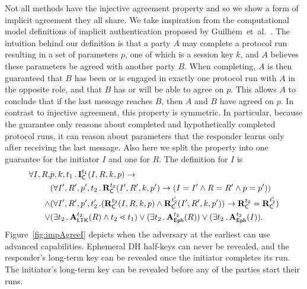 Not all \mEdhoc{} methods have the injective agreement property and so we show
a form of implicit agreement they all share.
%
We take inspiration from the computational model definitions of implicit
authentication proposed by Guilhem~et~al.~\cite{DBLP:conf/csfw/GuilhemFW20}.
%
The intuition behind our definition is that a party $A$ may complete a protocol
run resulting in a set of parameters $p$, one of which is a session key $k$,
and $A$ believes these parameters be agreed with another party $B$.
%
When completing, $A$ is then guaranteed that $B$ has been or is
engaged in exactly one protocol run with $A$ in the opposite role, and that $B$
has or will be able to agree on $p$.
%
This allows $A$ to conclude that if the last message reaches $B$, then
$A$ and $B$ have agreed on $p$.
%
In contrast to injective agreement, this property is symmetric.
%
In particular, because the guarantee only reasons about completed and
hypothetically completed protocol runs, it can reason about parameters that the
responder learns only after receiving the last message.
%
Also here we split the property into one guarantee for the initiator $I$ and
one for $R$.
%
The definition for $I$ is
\begin{align*}
    \forall I, R,& p, k, t_1\operatorname{.} \mathbf{I}_{\textsf{C}}^{t_1}(I, R, k, p)
    \rightarrow\\
      &(\forall I', R', p', t_2\operatorname{.} \mathbf{R}_{\textsf{C}}^{t_2}(I', R', k, p') \rightarrow
             (I=I' \land R=R' \land p=p'))\\
      \land &(\forall I', R', p', t_2'\operatorname{.}
             (\mathbf{R}_{\textsf{C}}^{t_2}(I, R, k, p)
             \land \mathbf{R}_{\textsf{C}}^{t_2'}(I', R', k, p')) \rightarrow
             \mathbf{R}_{\textsf{C}}^{t_2} = \mathbf{R}_{\textsf{C}}^{t_2'}
             )\\
    \lor&(\exists t_2\operatorname{.} \mathbf{A}_{\textsf{LTK}}^{t_2}(R) \land t_2 \lessdot t_1)
    \lor(\exists t_2\operatorname{.} \mathbf{A}_{\textsf{Eph}}^{t_2}(R))
    \lor (\exists t_2\operatorname{.} \mathbf{A}_{\textsf{Eph}}^{t_2}(I)).
\end{align*}
Figure~\ref{fig:impAgreeI} depicts when the adversary at the earliest can use
advanced capabilities.
%
Ephemeral DH half-keys can never be revealed, and the responder's long-term key
can be revealed once the initiator completes its run.
%
The initiator's long-term key can be revealed before any of the parties start
their runs.
%
